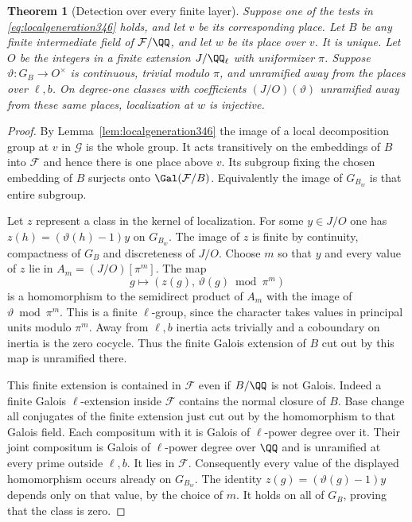 \documentclass[a4paper,11pt]{article}
\newtheorem{theorem}[proposition]{Theorem}
\theoremstyle{definition}
\theoremstyle{remark}
\numberwithin{equation}{section}
\begin{document}
\begin{theorem}[Detection over every finite layer]\leavevmode\label{thm:detectlayer346}
Suppose one of the tests in \eqref{eq:localgeneration346} holds,
and let $v$ be its corresponding place. Let $B$ be any finite
intermediate field of $\mathcal F/\QQ$, and let $w$ be its place
over $v$. It is unique. Let $O$ be the integers in a finite
extension $J/\QQ_\ell$ with uniformizer $\pi$. Suppose
$\vartheta:G_B\to O^\times$ is continuous, trivial modulo $\pi$,
and unramified away from the places over $\ell,b$.
On degree-one classes with coefficients $(J/O)(\vartheta)$
unramified away from these same places, localization at $w$
is injective.
\end{theorem}
\begin{proof}
By Lemma~\ref{lem:localgeneration346} the image of a local
decomposition group at $v$ in $\mathcal G$ is the whole group.
It acts transitively on the embeddings of $B$ into $\mathcal F$
and hence there is one place above $v$. Its subgroup fixing
the chosen embedding of $B$ surjects onto
$\Gal(\mathcal F/B)$. Equivalently the image of $G_{B_w}$
is that entire subgroup.

Let $z$ represent a class in the kernel of localization. For
some $y\in J/O$ one has
$z(h)=(\vartheta(h)-1)y$ on $G_{B_w}$. The image of $z$ is
finite by continuity, compactness of $G_B$ and discreteness
of $J/O$. Choose $m$ so that $y$ and every value of $z$ lie
in $A_m=(J/O)[\pi^m]$. The map
\[
      g\longmapsto (z(g),\,\vartheta(g)\bmod\pi^m)
\]
is a homomorphism to the semidirect product of $A_m$ with the
image of $\vartheta\bmod\pi^m$. This is a finite $\ell$-group,
since the character takes values in principal units modulo
$\pi^m$. Away from $\ell,b$ inertia acts trivially and a
coboundary on inertia is the zero cocycle. Thus the finite
Galois extension of $B$ cut out by this map is unramified there.

This finite extension is contained in $\mathcal F$ even if
$B/\QQ$ is not Galois. Indeed a finite Galois $\ell$-extension
inside $\mathcal F$ contains the normal closure of $B$. Base
change all conjugates of the finite extension just cut out by
the homomorphism to that Galois field. Each compositum with it
is Galois of $\ell$-power degree over it. Their joint compositum
is Galois of $\ell$-power degree over $\QQ$ and is unramified
at every prime outside $\ell,b$. It lies in $\mathcal F$.
Consequently every value of the displayed homomorphism occurs
already on $G_{B_w}$. The identity $z(g)=(\vartheta(g)-1)y$
depends only on that value, by the choice of $m$. It holds on
all of $G_B$, proving that the class is zero.
\end{proof}
\end{document}
